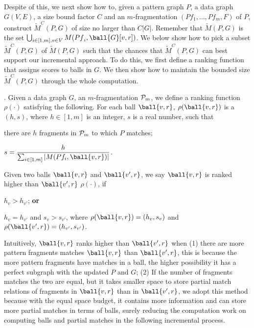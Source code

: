 Despite of this, we next show how to, given a pattern graph $P$, a data graph $G(V,E)$, a size bound factor $C$ and an $m$-fragmentation $({Pf}_1, \ldots, {Pf}_m, F)$ of $P$,  construct $\tilde{M}^{C}(P,G)$ of size no larger than $C|G|$. Remember that $\tilde{M}(P,G)$ is the set $\bigcup_{i\in[1,m], v\in V} M({Pf}_i, \ball{G}[v,r])$. We below show how to pick a subset $\tilde{M}^C(P,G)$ of $\tilde{M}(P,G)$ such that the chances that $\tilde{M}^C(P,G)$ can best support our incremental approach.
To do this, we first define a ranking function that assigns scores to balls in $G$. We then show how to maintain the bounded size $\tilde{M}^{C}(P,G)$ through the whole computation.

.
Given a data graph $G$, an $m$-fragmentation ${\cal P}_m$, we define a ranking function $\rho(\cdot)$ satisfying the following.
For each ball $\ball{v,r}$, $\rho(\ball{v,r})$ is a $(h, s)$, where $h\in [1, m]$ is an integer, $s$ is a real number, such that
\bi
\item [(i)] there are $h$ fragments in ${\cal P}_m$ to which $P$ matches;
\item [(ii)] $s = \dfrac{h}{\sum_{i\in [1,m]} |M(Pf_i, \ball{v,r})|}$.
\ei

Given two balls $\ball{v,r}$ and $\ball{v',r}$, we say $\ball{v,r}$ is ranked higher than $\ball{v',r}$ \wrt $\rho(\cdot)$, if
\bi
\item [(1)] $h_v > h_{v'}$; {\bf or}
\item [(2)] $h_v = h_{v'}$ and $s_v > s_{v'}$,
\ei
where $\rho(\ball{v,r}) = (h_v, s_v)$ and $\rho(\ball{v',r}) = (h_{v'}, s_{v'})$.

Intuitively, $\ball{v,r}$ ranks higher than $\ball{v', r}$ when (1) there are more pattern fragments matches $\ball{v,r}$ than $\ball{v',r}$, this is because the more pattern fragments have matches in a ball, the higher possibility it has a perfect subgraph with the updated $P$ and $G$; (2) If the number of fragments matches the two are equal, but it takes smaller space to store partial match relations of fragments in $\ball{v,r}$ than in $\ball{v',r}$, we adopt this method because with the equal space budget, it contains more information and can store more partial matches in terms of balls, surely reducing the computation work on computing balls and partial matches in the following incremental process.


